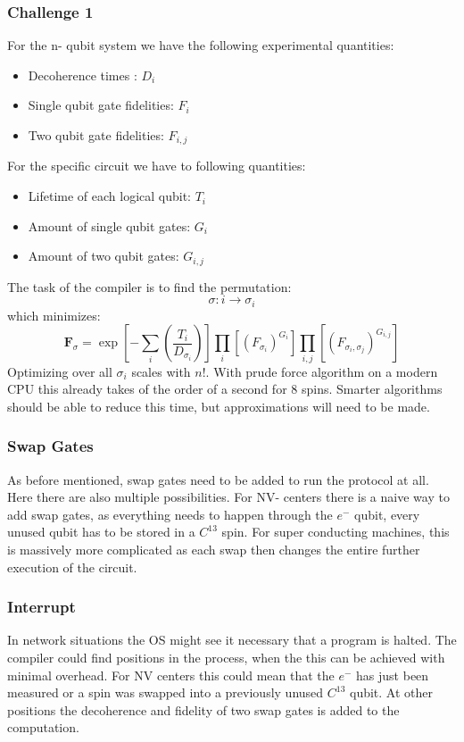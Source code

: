 \documentclass[]{article}
\begin{document}
\subsubsection{Challenge 1}
For the n- qubit system we have the following experimental quantities:
\begin{itemize}
	\item Decoherence times : $D_i$
	\item Single qubit gate fidelities: $F_i$
	\item Two qubit gate fidelities: $F_{i,j}$
\end{itemize}
For the specific circuit we have to following quantities:
\begin{itemize}
	\item Lifetime of each logical qubit: $T_i$
	\item Amount of single qubit gates: $G_i$
	\item Amount of two qubit gates: $G_{i,j}$
\end{itemize}
The task of the compiler is to find the permutation:
\begin{equation}
\sigma : i\rightarrow \sigma_i
\end{equation}
which minimizes:
\begin{equation}
\mathbf{F}_{\sigma}=\exp\left[-\sum_i\left(\frac{T_i}{D_{\sigma_i}}\right) \right] \prod_i\left[\left(F_{\sigma_i}\right)^{G_i}\right] \prod_{i,j}\left[\left(F_{\sigma_i,\sigma_j}\right)^{G_{i,j}}\right]
\end{equation}
Optimizing over all $\sigma_i$ scales with $n!$. With prude force algorithm on a modern CPU this already takes of the order of a second for 8 spins. Smarter algorithms should be able to reduce this time, but approximations will need to be made.
\subsubsection{Swap Gates}
As before mentioned, swap gates need to be added to run the protocol at all. Here there are also multiple possibilities. For NV- centers there is a naive way to add swap gates, as everything needs to happen through the $e^-$ qubit, every unused qubit has to be stored in a $C^{13}$ spin. For super conducting machines, this is massively more complicated as each swap then changes the entire further execution of the circuit.
\subsubsection{Interrupt}
In network situations the OS might see it necessary that a program is halted. The compiler could find positions in the process, when the this can be achieved with minimal overhead. For NV centers this could mean that the $e^-$ has just been measured or a spin was swapped into a previously unused $C^{13}$ qubit. At other positions the decoherence and fidelity of two swap gates is added to the computation.
\end{document}
